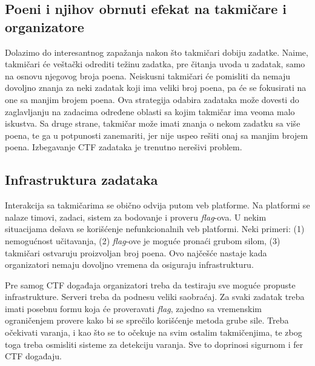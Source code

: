 \documentclass[12pt, a4paper, twocolumn]{article}
\begin{document}
\subsection{Poeni i njihov obrnuti efekat na takmičare i organizatore}

Dolazimo do interesantnog zapažanja nakon što takmičari dobiju zadatke.
Naime, takmičari će veštački odrediti težinu zadatka, pre čitanja uvoda u 
zadatak, samo na osnovu njegovog broja poena. Neiskusni takmičari će pomisliti
da nemaju dovoljno znanja za neki zadatak koji ima veliki broj poena, pa
će se fokusirati na one sa manjim brojem poena. Ova strategija odabira 
zadataka može dovesti do zaglavljanju na zadacima određene oblasti sa kojim
takmičar ima veoma malo iskustva. Sa druge strane, takmičar može imati
znanja o nekom zadatku sa više poena, te ga u potpunosti zanemariti, jer
nije uspeo rešiti onaj sa manjim brojem poena. Izbegavanje CTF zadataka
je trenutno nerešivi problem.

\subsection{Infrastruktura zadataka}

Interakcija sa takmičarima se obično odvija putom veb platforme. Na platformi 
se nalaze timovi, zadaci, sistem za bodovanje i proveru \emph{flag}-ova. U 
nekim situacijama dešava se korišćenje nefunkcionalnih veb platformi. Neki 
primeri: (1) nemogućnost učitavanja, (2) \emph{flag}-ove je moguće pronaći 
grubom silom, (3) takmičari ostvaruju proizvoljan broj poena. Ovo najčešće 
nastaje kada organizatori nemaju dovoljno vremena da osiguraju infrastrukturu.

Pre samog CTF događaja organizatori treba da testiraju sve moguće
propuste infrastrukture. Serveri treba da podnesu veliki saobraćaj.
Za svaki zadatak treba imati posebnu formu koja će proveravati \emph{flag},
zajedno sa vremenskim ograničenjem provere kako bi se sprečilo korišćenje
metoda grube sile. Treba očekivati varanja, i kao što se to očekuje na svim 
ostalim takmičenjima, te zbog toga treba osmisliti sisteme za detekciju 
varanja. Sve to doprinosi sigurnom i fer CTF događaju.

\end{document}
